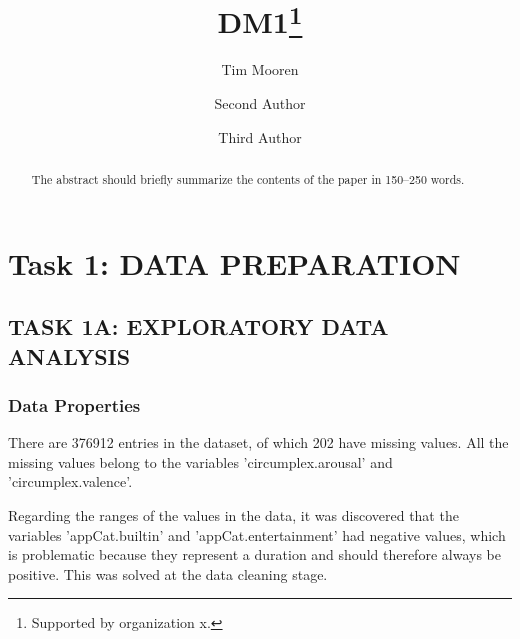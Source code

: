 \documentclass[runningheads]{llncs}
\begin{document}
%
\title{DM1\thanks{Supported by organization x.}}
%
%
\author{Tim Mooren \and
Second Author \and
Third Author}
%
%
%
\maketitle              %
%
\begin{abstract}
The abstract should briefly summarize the contents of the paper in
150--250 words.

\end{abstract}
%
%
%
\section{Task 1: DATA PREPARATION}
\subsection{TASK 1A: EXPLORATORY DATA ANALYSIS}
\subsubsection{Data Properties}
There are 376912 entries in the dataset, of which 202 have missing values. All the missing values belong to the variables 'circumplex.arousal' and 'circumplex.valence'. 

Regarding the ranges of the values in the data, it was discovered that the variables 'appCat.builtin' and 'appCat.entertainment' had negative values, which is problematic because they represent a duration and should therefore always be positive. This was solved at the data cleaning stage.
\end{document}
